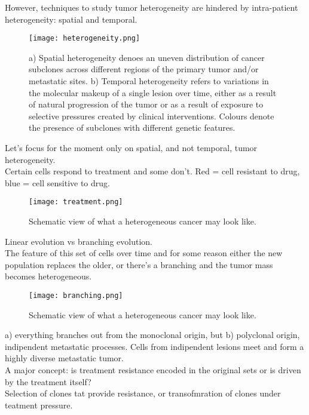 However, techniques to study tumor heterogeneity are hindered by intra-patient heterogeneity: spatial and temporal.


\begin{figure}[H]
	\texttt{[image: heterogeneity.png]}
	\caption{\label{fig:hetero} a) Spatial heterogeneity denoes an uneven distribution of cancer subclones across different regions of the primary tumor and/or metastatic sites. b) Temporal heterogeneity refers to variations in the molecular makeup of a single lesion over time, either as a result of natural progression of the tumor or as a result of exposure to selective pressures created by clinical interventions. Colours denote the presence of subclones with different genetic features.}
\end{figure}

Let's focus for the moment only on spatial, and not temporal, tumor heterogeneity. \\
Certain cells respond to treatment and some don't. Red = cell resistant to drug, blue = cell sensitive to drug.

\begin{figure}[H]
	\texttt{[image: treatment.png]}
	\caption{\label{fig:treatment} Schematic view of what a heterogeneous cancer may look like.}
\end{figure}

Linear evolution vs branching evolution.\\
The feature of this set of cells over time and for some reason either the new population replaces the older, or there's a branching and the tumor mass becomes heterogeneous.\\
\begin{figure}[H]
	\texttt{[image: branching.png]}
	\caption{\label{fig:branching} Schematic view of what a heterogeneous cancer may look like.}
\end{figure}

a) everything branches out from the monoclonal origin, but b) polyclonal origin, indipendent metastatic processes. Cells from indipendent lesions meet and form a highly diverse metastatic tumor.\\

A major concept: is treatment resistance encoded in the original sets or is driven by the treatment itself?\\
Selection of clones tat provide resistance, or transofmration of clones under teatment pressure.

